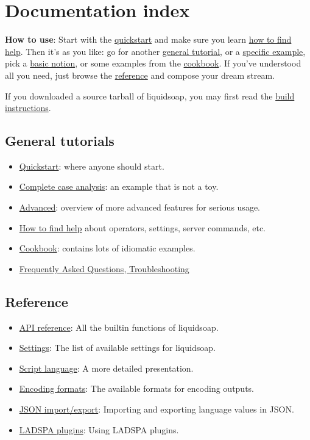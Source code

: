 \section{Documentation index}
\textbf{How to use}: Start with the \href{quick_start.html}{quickstart} and 
make sure you learn \href{help.html}{how to find help}. Then it's as you like:
go for another \href{#general}{general tutorial}, or a 
\href{#specific}{specific example},
pick a \href{#core}{basic notion}, or some examples from the 
\href{cookbook.html}{cookbook}. If you've understood all you need,
just browse the \href{reference.html}{reference} and compose your dream stream.

If you downloaded a source tarball of liquidsoap, you may first read the
\href{build.html}{build instructions}.

\subsection{General tutorials}
\begin{itemize}
\item \href{quick_start.html}{Quickstart}: where anyone should start.
\item \href{complete_case.html}{Complete case analysis}: an example that is not a toy.
\item \href{advanced.html}{Advanced}: overview of more advanced features for serious usage.
\item \href{help.html}{How to find help} about operators, settings, server commands, etc.
\item \href{cookbook.html}{Cookbook}: contains lots of idiomatic examples.
\item \href{faq.html}{Frequently Asked Questions, Troubleshooting}

\end{itemize}
\subsection{Reference}
\begin{itemize}
\item \href{reference.html}{API reference}: All the builtin functions of liquidsoap.
\item \href{settings.html}{Settings}: The list of available settings for liquidsoap.
\item \href{language.html}{Script language}: A more detailed presentation.
\item \href{encoding_formats.html}{Encoding formats}: The available formats for encoding outputs.
\item \href{json.html}{JSON import/export}: Importing and exporting language values in JSON.
\item \href{ladspa.html}{LADSPA plugins}: Using LADSPA plugins.

\end{itemize}
